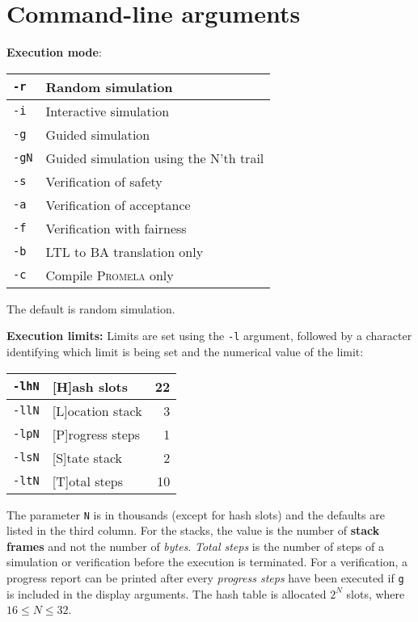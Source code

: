 \documentclass[11pt]{article}
\newcommand*{\prm}{\textsc{Promela}}
\newcommand*{\p}[1]{\texttt{#1}}
\begin{document}
\section{Command-line arguments}
\textbf{Execution mode}:
\begin{center}
\begin{tabular}{|l|p{}|}
\hline
\p{-r} & Random simulation\\\hline
\p{-i} & Interactive simulation\\\hline
\p{-g} & Guided simulation\\\hline
\p{-gN} & Guided simulation using the N'th trail\\\hline\hline
\p{-s} & Verification of safety\\\hline
\p{-a} & Verification of acceptance\\\hline
\p{-f} & Verification with fairness\\\hline\hline
\p{-b} & LTL to BA translation only\\\hline
\p{-c} & Compile \prm{} only\\\hline
\end{tabular}
\end{center}
The default is random simulation.

\textbf{Execution limits:}
Limits are set using the \p{-l} argument, followed by a character
identifying which limit is being set and the numerical value of the
limit:
\begin{center}
\begin{tabular}{|l|p{}|r|}
\hline
\p{-lhN} & [H]ash slots & 22\\\hline
\p{-llN} & [L]ocation stack & 3\\\hline
\p{-lpN} & [P]rogress steps & 1\\\hline
\p{-lsN} & [S]tate stack & 2\\\hline
\p{-ltN} & [T]otal steps & 10\\\hline
\end{tabular}
\end{center}

The parameter \p{N} is in thousands (except for hash slots) and the defaults are listed in the
third column. For the stacks, the value is the number of \textbf{stack
frames} and not the number of \emph{bytes}. \emph{Total steps} is the
number of steps of a simulation or verification before the execution is
terminated. For a verification, a progress report can be printed after
every \emph{progress steps} have been executed if \p{g} is included in
the display arguments. The hash table is allocated $2^{N}$ slots, where
$16 \leq N \leq 32$.
\end{document}
